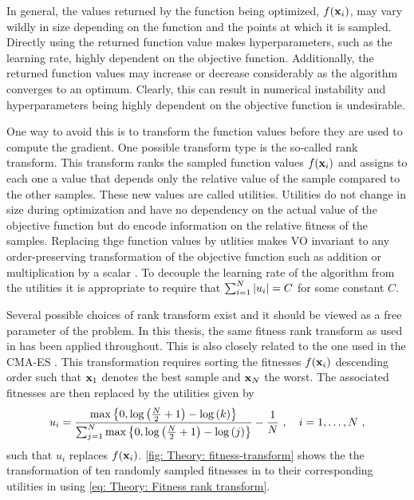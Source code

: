 In general, the values returned by the function being optimized, $f({\mathbf{x}}_i)$, may vary wildly in size depending on the function and the points at which it is sampled. Directly using the returned function value makes hyperparameters, such as the learning rate, highly dependent on the objective function. Additionally, the returned function values may increase or decrease considerably as the algorithm converges to an optimum. Clearly, this can result in numerical instability and hyperparameters being highly dependent on the objective function is undesirable.

One way to avoid this is to transform the function values before they are used to compute the gradient. One possible transform type is the so-called rank transform. 
This transform ranks the sampled function values $f({\mathbf{x}}_i)$ and assigns to each one a value that depends only the relative value of the sample compared to the other samples. These new values are called utilities.
Utilities do not change in size during optimization and have no dependency on the actual value of the objective function but do encode information on the relative fitness of the samples. Replacing thge function values by utlities makes \gls{VO} invariant to any order-preserving transformation of the objective function such as addition or multiplication by a scalar \cite{Wierstra2008}. To decouple the learning rate of the algorithm from the utilities it is appropriate to require that $\sum_{i=1}^N {\left\lvert u_i\right\rvert} = C$ for some constant $C$.

Several possible choices of rank transform exist and it should be viewed as a free parameter of the problem. In this thesis, the same fitness rank transform as used in \cite{Wierstra2008} has been applied throughout. This is also closely related to the one used in the \gls{CMA-ES} \cite{Hansen2001}. This transformation requires sorting the fitnesses $f({\mathbf{x}}_i)$ descending order such that ${\mathbf{x}}_1$ denotes the best sample and ${\mathbf{x}}_N$ the worst. The associated fitnesses are then replaced by the utilities given by
\begin{equation}\label{eq: Theory: Fitness rank transform}
    u_i = \frac{\max\cbra{0, \log\pa{\frac{N}{2}+1}-\log\pa{k}}}{\sum_{j=1}^N\max\cbra{0, \log\pa{\frac{N}{2}+1}-\log\pa{j}}} - \frac{1}{N} \ ,\quad i=1,\dots,N \ ,
\end{equation}
such that $u_i$ replaces $f({\mathbf{x}}_i)$. \autoref{fig: Theory: fitness-transform} shows the the transformation of ten randomly sampled fitnesses in  to their corresponding utilities in  using \eqref{eq: Theory: Fitness rank transform}.







